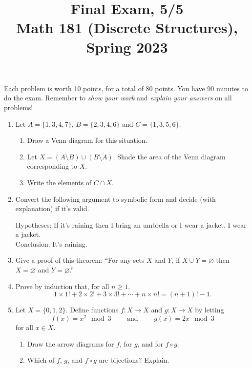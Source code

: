 \documentclass[11pt]{article}
\title{Final Exam, 5/5 \\Math 181 (Discrete Structures), Spring 2023}
\date{}
\begin{document}
\maketitle

\thispagestyle{empty}

\vspace{-1.8cm}

Each problem is worth 10 points, for a total of 80 points. You have 90 minutes to do the exam. Remember to \emph{show your work} and \emph{explain your answers} on all problems!

\begin{enumerate}

\item Let $A=\{1,3,4,7\}$, $B= \{2,3,4,6\}$ and $C = \{1,3,5,6\}$.
\begin{enumerate}
\item Draw a Venn diagram for this situation.
\item Let $X = (A \setminus B) \cup (B \setminus A)$. Shade the area of the Venn diagram corresponding to $X$.
\item Write the elements of $C \cap X$.
\end{enumerate}

\item Convert the following argument to symbolic form and decide (with explanation) if it's valid. 
\smallskip

Hypotheses: If it's raining then I bring an umbrella or I wear a jacket. I wear a jacket. \\ Conclusion: It's raining.
\item Give a proof of this theorem: ``For any sets $X$ and $Y$, if $X \cup Y = \varnothing$ then $X= \varnothing$ and $Y=\varnothing$.''

\item Prove by induction that, for all $n \geq 1$,
\[ 1\times 1! + 2 \times 2! + 3 \times 3! + \cdots + n \times n! = (n+1)! - 1.\]

\item Let $X = \{0,1,2\}$. Define functions $f\colon X \to X$ and $g\colon X \to X$ by letting
\[ f(x) = x^2 \mod 3 \qquad \textrm{ and } \qquad g(x) = 2x \mod 3\]
for all $x \in X$.
\begin{enumerate}
\item Draw the arrow diagrams for $f$, for $g$, and for $f\circ g$.
\item Which of $f$, $g$, and $f\circ g$ are bijections? Explain.
\end{enumerate}


\end{enumerate}
\end{document}
